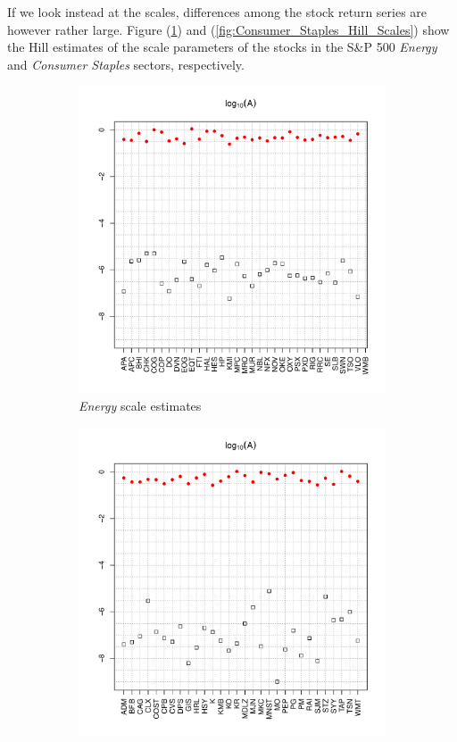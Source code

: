 \documentclass{article}
\begin{document}
If we look instead at the scales, differences among the stock return
series are however rather large. Figure (\ref{fig:Energy_Hill_Scales})
and (\ref{fig:Consumer_Staples_Hill_Scales}) show the Hill estimates of
the scale parameters of the stocks in the S\&P 500 {\it Energy} and
{\it Consumer Staples} sectors, respectively.
\begin{figure}[htb!]
  \begin{subfigure}{0.45\textwidth}
    \includegraphics[width=\textwidth]{Energy_Hill_scales.pdf}
    \caption{{\it Energy} scale estimates}    
    \label{fig:Energy_Hill_Scales}
  \end{subfigure}
  \begin{subfigure}{0.45\textwidth}
    \includegraphics[width=\textwidth]{Consumer_Staples_Hill_scales.pdf}

\end{subfigure}
\end{figure}
\end{document}

